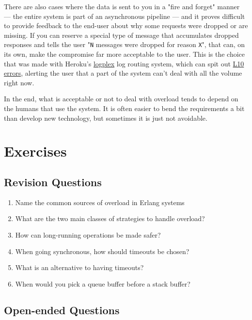\documentclass[11pt, oneside]{book}   	%
\newcommand{\var}[1]{\Verb`#1`}
\begin{document}
There are also cases where the data is sent to you in a "fire and forget" manner — the entire system is part of an asynchronous pipeline — and it proves difficult to provide feedback to the end-user about why some requests were dropped or are missing. If you can reserve a special type of message that accumulates dropped responses and tells the user "\var{N} messages were dropped for reason \var{X}", that can, on its own, make the compromise far more acceptable to the user. This is the choice that was made with Heroku's \href{https://devcenter.heroku.com/articles/logplex}{logplex} log routing system, which can spit out \href{https://devcenter.heroku.com/articles/error-codes\#l10-drain-buffer-overflow}{L10 errors}, alerting the user that a part of the system can't deal with all the volume right now.

In the end, what is acceptable or not to deal with overload tends to depend on the humans that use the system. It is often easier to bend the requirements a bit than develop new technology, but sometimes it is just not avoidable.


\section{Exercises}

\subsection{Revision Questions}

\begin{enumerate}
	\item Name the common sources of overload in Erlang systems
	\item What are the two main classes of strategies to handle overload?
	\item How can long-running operations be made safer?
	\item When going synchronous, how should timeouts be chosen?
	\item What is an alternative to having timeouts?
	\item When would you pick a queue buffer before a stack buffer?
\end{enumerate}

\subsection{Open-ended Questions}
\end{document}

